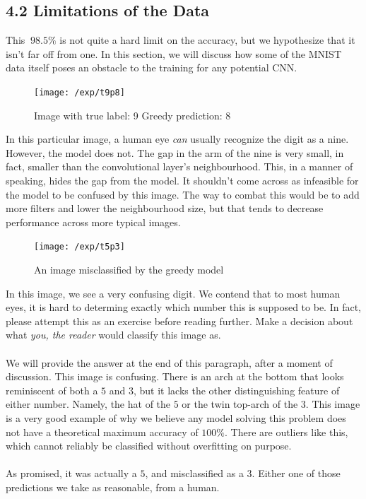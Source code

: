 \documentclass{article}
\begin{document}
\subsection*{4.2 Limitations of the Data}
This $~98.5\%$ is not quite a hard limit on the accuracy, but we hypothesize that it isn't far off from one. In this section, we will discuss how some of the MNIST data itself poses an obstacle to the training for any potential CNN.
\begin{figure}[H]
\texttt{[image: /exp/t9p8]}
\caption{Image with true label: 9 Greedy prediction: 8}
\end{figure}
In this particular image, a human eye \textit{can} usually recognize the digit as a nine. However, the model does not. The gap in the arm of the nine is very small, in fact, smaller than the convolutional layer's neighbourhood. This, in a manner of speaking, hides the gap from the model. It shouldn't come across as infeasible for the model to be confused by this image. The way to combat this would be to add more filters and lower the neighbourhood size, but that tends to decrease performance across more typical images.
\begin{figure}[H]
\texttt{[image: /exp/t5p3]}
\caption{An image misclassified by the greedy model}
\end{figure}
In this image, we see a very confusing digit. We contend that to most human eyes, it is hard to determing exactly which number this is supposed to be. In fact, please attempt this as an exercise before reading further. Make a decision about what \textit{you, the reader} would classify this image as.\\\\
We will provide the answer at the end of this paragraph, after a moment of discussion. This image is confusing. There is an arch at the bottom that looks reminiscent of both a $5$ and $3$, but it lacks the other distinguishing feature of either number. Namely, the hat of the $5$ or the twin top-arch of the $3$. This image is a very good example of why we believe any model solving this problem does not have a theoretical maximum accuracy of $100\%$. There are outliers like this, which cannot reliably be classified without overfitting on purpose.\\\\
As promised, it was actually a $5$, and misclassified as a $3$. Either one of those predictions we take as reasonable, from a human.
\end{document}

